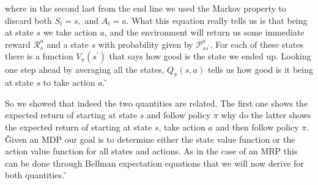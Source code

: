 where in the second last from the end line we used the Markov property to discard both $S_t = s,$ and $A_t=a$. What
this equation really tells us is that being at state $s$ we take action $a$, and the environment will return us some
immediate reward $\mathcal{R}_{s}^{a}$ and a state $s$ with probability given by $\mathcal{P}_{s s^\prime}^{a}$. For
each of these states there is a function $V_{\pi}(s^\prime)$ that says how good is the state we ended up. Looking one
step ahead by averaging all the states, $Q_{\pi}(s, a)$ tells us how good is it being at state $s$ to take action $a$.
\v


\vspace{-10pt}

So we showed that indeed the two quantities are related. The first one shows the expected return of starting at state
$s$ and follow policy $\pi$ why do the latter shows the expected return of starting at state $s$, take action $a$ and
then follow policy $\pi$. \v

Given an MDP our goal is to determine either the state value function or the action value function for all states and
actions. As in the case of an MRP this can be done through Bellman expectation equations that we will now derive for
both quantities. \v

